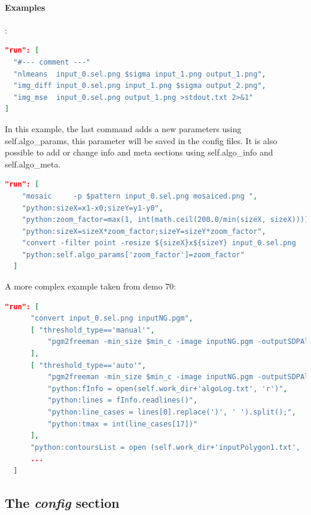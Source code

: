 \paragraph{Examples}:\\
\begin{lstlisting}[language=json,firstnumber=1]
"run": [
  "#--- comment ---"
  "nlmeans  input_0.sel.png $sigma input_1.png output_1.png",
  "img_diff input_0.sel.png input_1.png $sigma output_2.png",
  "img_mse  input_0.sel.png output_1.png >stdout.txt 2>&1"
]
\end{lstlisting}

In this example, the last command adds a new parameters using self.algo\_params,
this parameter will be saved in the config files. It is also possible to add 
or change info and meta sections using self.algo\_info and self.algo\_meta.
\begin{lstlisting}[language=json,firstnumber=1]
  "run": [ 
    "mosaic     -p $pattern input_0.sel.png mosaiced.png ",
    "python:sizeX=x1-x0;sizeY=y1-y0",
    "python:zoom_factor=max(1, int(math.ceil(200.0/min(sizeX, sizeX))))",
    "python:sizeX=sizeX*zoom_factor;sizeY=sizeY*zoom_factor",
    "convert -filter point -resize ${sizeX}x${sizeY} input_0.sel.png    input_0.sel_zoom.png",
    "python:self.algo_params['zoom_factor']=zoom_factor"
  ]
\end{lstlisting}

A more complex example taken from demo 70:
\begin{lstlisting}[language=json,firstnumber=1]
  "run": [ 
      "convert input_0.sel.png inputNG.pgm",
      [ "threshold_type=='manual'", 
          "pgm2freeman -min_size $min_c -image inputNG.pgm -outputSDPAll -maxThreshold $tmax -minThreshold $tmin >inputPolygon.txt 2>algoLog.txt"
      ],
      [ "threshold_type=='auto'",   
          "pgm2freeman -min_size $min_c -image inputNG.pgm -outputSDPAll >inputPolygon.txt 2>algoLog.txt",
          "python:fInfo = open(self.work_dir+'algoLog.txt', 'r')",
          "python:lines = fInfo.readlines()",
          "python:line_cases = lines[0].replace(')', ' ').split();",
          "python:tmax = int(line_cases[17])"
      ],
      "python:contoursList = open (self.work_dir+'inputPolygon1.txt', 'w')",
      ...
  ]
\end{lstlisting}
 

\subsection{The \emph{config} section}

